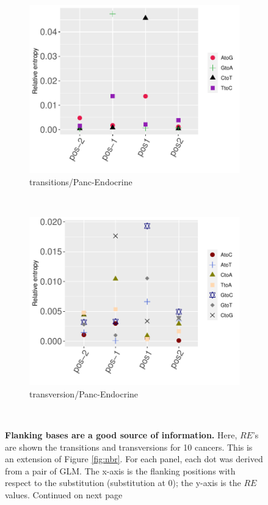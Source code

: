 \begin{figure}[ht!]
    \begin{subfigure}{.5\textwidth}
    \includegraphics[scale=0.63]{graphics/nbr_transitions_Panc-Endocrine.pdf}
    \caption{transitions/Panc-Endocrine}
    \label{fig:transitions_panc-endocrine}
    \end{subfigure}
    ~
    \begin{subfigure}{.5\textwidth}
    \includegraphics[scale=0.63]{graphics/nbr_transversion_Panc-Endocrine.pdf}
    \caption{transversion/Panc-Endocrine}
    \label{fig:transversion_panc-endocrine}
    \end{subfigure} \\
    \caption{\textbf{Flanking bases are a good source of information.} Here, $RE$'s are shown the transitions and transversions for 10 cancers. This is an extension of Figure \ref{fig:nbr}. For each panel, each dot was derived from a pair of GLM. The x-axis is the flanking positions with respect to the substitution (substitution at 0); the y-axis is the $RE$ values. Continued on next page}
\end{figure}
